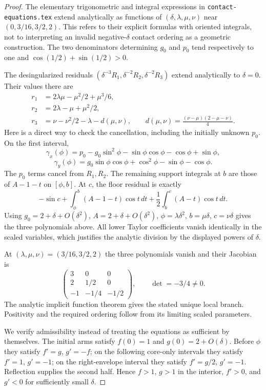 \documentclass[11pt]{article}
\begin{document}
\begin{proof}
The elementary trigonometric and integral expressions in \texttt{contact-equations.tex} extend analytically as functions of $(\delta,\lambda,\mu,\nu)$ near $(0,3/16,3/2,2)$. This refers to their explicit formulas with oriented integrals, not to interpreting an invalid negative-$\delta$ contact ordering as a geometric construction. The two denominators determining $g_0$ and $p_0$ tend respectively to one and $\cos(1/2)+\sin(1/2)>0$.

The desingularized residuals $(\delta^{-3}R_1,\delta^{-2}R_2,\delta^{-2}R_3)$ extend analytically to $\delta=0$. Their values there are
\begin{align*}
 r_1&=2\lambda\mu-\mu^2/2+\mu^3/6,\\
 r_2&=2\lambda-\mu+\mu^2/2,\\
 r_3&=\nu-\nu^2/2-\lambda-d(\mu,\nu),\qquad
 d(\mu,\nu)=\frac{(\nu-\mu)(2-\mu-\nu)}4.
\end{align*}
Here is a direct way to check the cancellation, including the initially unknown $p_0$. On the first interval,
\[
 \gamma_x(\phi)=p_0-g_0\sin^2\phi-\sin\phi\cos\phi-\cos\phi+\sin\phi,
\]
\[
 \gamma_y(\phi)=g_0\sin\phi\cos\phi+\cos^2\phi-\sin\phi-\cos\phi.
\]
The $p_0$ terms cancel from $R_1,R_2$. The remaining support integrals at $b$ are those of $A-1-t$ on $[\phi,b]$. At $c$, the floor residual is exactly
\[
 -\sin c+\int_\phi^b(A-1-t)\cos t\,dt
             +\frac12\int_b^c(A-t)\cos t\,dt.
\]
Using $g_0=2+\delta+O(\delta^2)$, $A=2+\delta+O(\delta^2)$, $\phi=\lambda\delta^2$, $b=\mu\delta$, $c=\nu\delta$ gives the three polynomials above. All lower Taylor coefficients vanish identically in the scaled variables, which justifies the analytic division by the displayed powers of $\delta$.

At $(\lambda,\mu,\nu)=(3/16,3/2,2)$ the three polynomials vanish and their Jacobian is
\[
 \begin{pmatrix}3&0&0\\2&1/2&0\\-1&-1/4&-1/2\end{pmatrix},
 \qquad \det=-3/4\ne0.
\]
The analytic implicit function theorem gives the stated unique local branch. Positivity and the required ordering follow from its limiting scaled parameters.

We verify admissibility instead of treating the equations as sufficient by themselves. The initial arms satisfy $f(0)=1$ and $g(0)=2+O(\delta)$. Before $\phi$ they satisfy $f'=g$, $g'=-f$; on the following core-only intervals they satisfy $f'=1$, $g'=-1$; on the right-envelope interval they satisfy $f'=g/2$, $g'=-1$. Reflection supplies the second half. Hence $f>1$, $g>1$ in the interior, $f'>0$, and $g'<0$ for sufficiently small $\delta$.


\end{proof}
\end{document}
